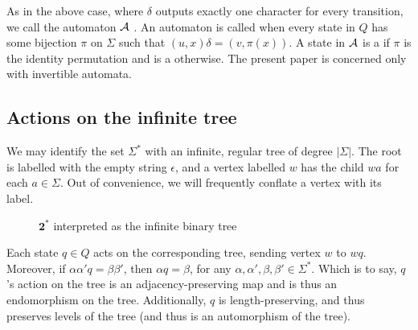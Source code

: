 \documentclass[11pt, titlepage]{article}
\begin{document}
As in the above case, where $\delta$ outputs exactly one character for
every transition, we call the automaton $\mathcal{A}$ . An
automaton is called  when every state in $Q$ has some
bijection $\pi$ on $\Sigma$ such that $(u, x)\delta = (v, \pi(x))$. A
state in $\mathcal{A}$ is a  if $\pi$ is the identity
permutation and is a  otherwise. The present paper
is concerned only with invertible automata.

\subsection{Actions on the infinite tree}

We may identify the set $\Sigma^*$ with an infinite, regular tree of
degree $|\Sigma|$. The root is labelled with the empty string
$\epsilon$, and a vertex labelled $w$ has the child $wa$ for each
$a \in \Sigma$. Out of convenience, we will frequently conflate a
vertex with its label.

\begin{figure}
\begin{center}
\caption{$\textbf{2}^*$ interpreted as the infinite binary tree}
\end{center}
\end{figure}

Each state $q \in Q$ acts on the corresponding tree, sending vertex
$w$ to $wq$. Moreover, if $\alpha \alpha' q = \beta \beta'$, then
$\alpha q = \beta$, for any
$\alpha, \alpha', \beta, \beta' \in \Sigma^*$. Which is to say, $q$'s
action on the tree is an adjacency-preserving map and is thus an
endomorphism on the tree. Additionally, $q$ is length-preserving, and
thus preserves levels of the tree (and thus is an automorphism of the
tree).
\end{document}
